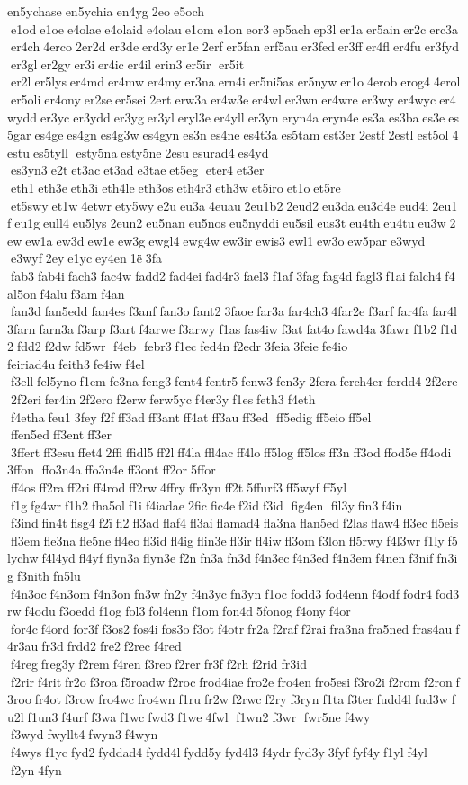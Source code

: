  	en5ychase en5ychia en4yg 2eo e5och  e1od e1oe e4olae e4olaid e4olau e1om e1on eor3 ep5ach ep3l er1a er5ain er2c erc3a er4ch 4erco 2er2d er3de erd3y er1e 2erf er5fan erf5au er3fed er3ff er4fl er4fu er3fyd er3gl er2gy er3i er4ic er4il erin3 er5ir  er5it  er2l er5lys er4md er4mw er4my er3na ern4i er5ni5as er5nyw er1o 4erob erog4 4erol er5oli er4ony er2se er5sei 2ert erw3a er4w3e er4wl er3wn er4wre er3wy er4wyc er4wydd er3yc er3ydd er3yg er3yl eryl3e er4yll er3yn eryn4a eryn4e es3a es3ba es3e es5gar es4ge es4gn es4g3w es4gyn es3n es4ne es4t3a es5tam est3er 2estf 2estl est5ol 4estu es5tyll  esty5na esty5ne 2esu esurad4 es4yd  es3yn3 e2t et3ac et3ad e3tae et5eg  eter4 et3er  eth1 eth3e eth3i eth4le eth3os eth4r3 eth3w et5iro et1o et5re  et5swy et1w 4etwr ety5wy e2u eu3a 4euau 2eu1b2 2eud2 eu3da eu3d4e eud4i 2eu1f eu1g eull4 eu5lys 2eun2 eu5nan eu5nos eu5nyddi eu5sil eus3t eu4th eu4tu eu3w 2ew ew1a ew3d ew1e ew3g ewgl4 ewg4w ew3ir ewis3 ewl1 ew3o ew5par e3wyd  e3wyf 2ey e1yc ey4en 1ë 3fa  fab3 fab4i fach3 fac4w fadd2 fad4ei fad4r3 fael3 f1af 3fag fag4d fagl3 f1ai falch4 f4al5on f4alu f3am f4an  fan3d fan5edd fan4es f3anf fan3o fant2 3faoe far3a far4ch3 4far2e f3arf far4fa far4l 3farn farn3a f3arp f3art f4arwe f3arwy f1as fas4iw f3at fat4o fawd4a 3fawr f1b2 f1d2 fdd2 f2dw fd5wr  f4eb  febr3 f1ec fed4n f2edr 3feia 3feie fe4io 	feiriad4u feith3 fe4iw f4el  f3ell fel5yno f1em fe3na feng3 fent4 fentr5 fenw3 fen3y 2fera ferch4er ferdd4 2f2ere 2f2eri fer4in 2f2ero f2erw ferw5yc f4er3y f1es feth3 f4eth  f4etha feu1 3fey f2f ff3ad ff3ant ff4at ff3au ff3ed  ff5edig ff5eio ff5el  ffen5ed ff3ent ff3er  3ffert ff3esu ffet4 2ffi ffidl5 ff2l ff4la ffl4ac ff4lo ff5log ff5los ff3n ff3od ffod5e ff4odi 3ffon  ffo3n4a ffo3n4e ff3ont ff2or 5ffor  ff4os ff2ra ff2ri ff4rod ff2rw 4ffry ffr3yn ff2t 5ffurf3 ff5wyf ff5yl  f1g fg4wr f1h2 fha5ol f1i f4iadae 2fic fic4e f2id f3id  fig4en  fil3y fin3 f4in  f3ind fin4t fisg4 f2ï fl2 fl3ad flaf4 fl3ai flamad4 fla3na flan5ed f2las flaw4 fl3ec fl5eis fl3em fle3na fle5ne fl4eo fl3id fl4ig flin3e fl3ir fl4iw fl3om f3lon fl5rwy f4l3wr f1ly f5lychw f4l4yd fl4yf flyn3a flyn3e f2n fn3a fn3d f4n3ec f4n3ed f4n3em f4nen f3nif fn3ig f3nith fn5lu  f4n3oc f4n3om f4n3on fn3w fn2y f4n3yc fn3yn f1oc fodd3 fod4enn f4odf fodr4 fod3rw f4odu f3oedd f1og fol3 fol4enn f1om fon4d 5fonog f4ony f4or  for4c f4ord for3f f3os2 fos4i fos3o f3ot f4otr fr2a f2raf f2rai fra3na fra5ned fras4au f4r3au fr3d frdd2 fre2 f2rec f4red  f4reg freg3y f2rem f4ren f3reo f2rer fr3f f2rh f2rid fr3id  f2rir f4rit fr2o f3roa f5roadw f2roc frod4iae fro2e fro4en fro5esi f3ro2i f2rom f2ron f3roo fr4ot f3row fro4wc fro4wn f1ru fr2w f2rwc f2ry f3ryn f1ta f3ter fudd4l fud3w fu2l f1un3 f4urf f3wa f1wc fwd3 f1we 4fwl  f1wn2 f3wr  fwr5ne f4wy  f3wyd fwyllt4 fwyn3 f4wyn  f4wys f1yc fyd2 fyddad4 fydd4l fydd5y fyd4l3 f4ydr fyd3y 3fyf fyf4y f1yl f4yl  f2yn 4fyn 
